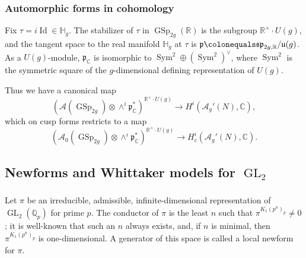 \documentclass[12pt]{amsart}
\DeclareMathOperator{\Sym}{Sym}
\theoremstyle{definition}
\newcommand{\C}{\mathbb{C}}
\newcommand{\Q}{\mathbb{Q}}
\newcommand{\R}{\mathbb{R}}
\DeclareMathOperator{\GL}{GL}
\DeclareMathOperator{\GSp}{GSp}
\begin{document}
\subsubsection{Automorphic forms in cohomology}\label{appendix subsec:automorphic forms}
Fix $\tau=  i \operatorname{Id} \in \mathbb H_g$. The stabilizer of $\tau$ in $\GSp_{2g}(\R)$ is the subgroup $\R^\times \cdot U(g)$, and the tangent space to the real manifold $\mathbb H_g$ at $\tau$ is $\mathfrak p \colonequals \mathfrak{sp}_{2g, \R}/ \mathfrak{u}(g)$. As a $U(g)$-module, $\mathfrak p_\C$ is isomorphic to $\Sym^2 \oplus (\Sym^2)^\vee$, where $\Sym^2$ is the symmetric square of the $g$-dimensional defining representation of $U(g)$. 

Thus we have a canonical map
\begin{equation}
    (\mathcal A(\GSp_{2g})\otimes \wedge^i \mathfrak p^\ast_\C)^{\R^\times \cdot U(g)} \to H^i(\mathcal A_g'(N), \C),
\end{equation}
which on cusp forms restricts to a map 
\begin{equation}\label{appendix eqn:cusp form realization map}
    (\mathcal A_0(\GSp_{2g})\otimes \wedge^i \mathfrak p^\ast_\C)^{\R^\times \cdot U(g)} \to H^i_c(\mathcal A_g'(N), \C).
\end{equation}
\subsection{Newforms and Whittaker models for $\GL_2$}\label{appendix subsection some rep theory}
\subsubsection{}
Let $\pi$ be an irreducible, admissible, infinite-dimensional representation of $\GL_2(\Q_p)$ for prime $p$. 
The conductor of $\pi$ is the least $n$ such that $\pi^{K_1(p^n)_p} \neq 0$; it is well-known that such an $n$ always exists, and, if $n$ is minimal, then $\pi^{K_1(p^n)_p}$ is one-dimensional. A generator of this space is called a local newform for $\pi$. 
\end{document}
